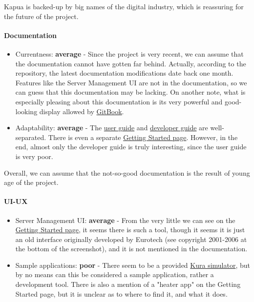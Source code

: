 \documentclass{article}
\begin{document}
Kapua is backed-up by big names of the digital industry, which is reassuring for the future of the project.

\paragraph{Documentation}

\begin{itemize}
\item Currentness: \textbf{average} - Since the project is very recent, we can assume that the documentation cannot have gotten far behind. Actually, according to the repository, the latest documentation modifications date back one month. Features like the Server Management UI are not in the documentation, so we can guess that this documentation may be lacking. On another note, what is especially pleasing about this documentation is its very powerful and good-looking display allowed by \href{https://www.gitbook.com/}{GitBook}.
\item Adaptability: \textbf{average} - The \href{http://download.eclipse.org/kapua/docs/develop/user-manual/en/}{user guide} and \href{http://download.eclipse.org/kapua/docs/develop/developer-guide/en/}{developer guide} are well-separated. There is even a separate \href{https://www.eclipse.org/kapua/getting-started.php}{Getting Started page}. However, in the end, almost only the developer guide is truly interesting, since the user guide is very poor.
\end{itemize}

Overall, we can assume that the not-so-good documentation is the result of young age of the project.

\paragraph{UI-UX}

\begin{itemize}
\item Server Management UI: \textbf{average} - From the very little we can see on the \href{https://www.eclipse.org/kapua/getting-started.php}{Getting Started page}, it seems there is such a tool, though it seems it is just an old interface originally developed by Eurotech (see copyright 2001-2006 at the bottom of the screenshot), and it is not mentioned in the documentation.
\item Sample applications: \textbf{poor} - There seem to be a provided \href{http://download.eclipse.org/kapua/docs/develop/user-manual/en/simulator.html}{Kura simulator}, but by no means can this be considered a sample application, rather a development tool. There is also a mention of a "heater app" on the Getting Started page, but it is unclear as to where to find it, and what it does.
\end{itemize}
\end{document}
